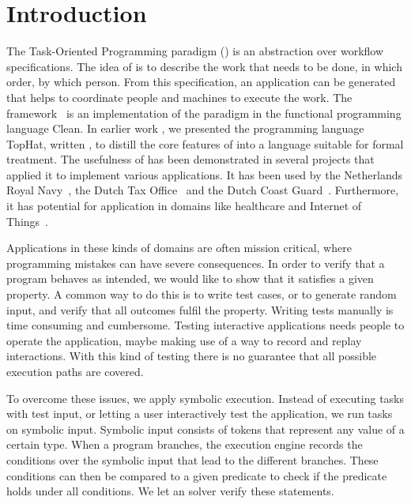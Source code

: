 
\section{Introduction}

The Task-Oriented Programming paradigm (\TOP) is an abstraction over workflow specifications.
The idea of \TOP is to describe the work that needs to be done, in which order, by which person.
From this specification, an application can be generated that helps to coordinate people and machines to execute the work.
The \ITASKS framework~\cite{DBLP:conf/ppdp/PlasmeijerLMAK12} is an implementation of the paradigm in the functional programming language Clean.
In earlier work \cite{Steenvoorden2019}, we presented the programming language TopHat, written \TOPHAT, to distill the core features of \TOP into a language suitable for formal treatment.
%
The usefulness of \TOP has been demonstrated in several projects that applied it to implement various applications.
It has been used by the Netherlands Royal Navy~\cite{jansen2018dynamic}, the Dutch Tax Office~\cite{conf/sfp/StutterheimAP17} and the Dutch Coast Guard~\cite{lijnse2012incidone}. %
Furthermore, it has potential for application in domains like healthcare and Internet of Things~\cite{DBLP:conf/cgo/KoopmanLP18}.

Applications in these kinds of domains are often mission critical, where programming mistakes can have severe consequences.
In order to verify that a \TOPHAT program behaves as intended, we would like to show that it satisfies a given property.
A common way to do this is to write test cases, or to generate random input, and verify that all outcomes fulfil the property.
Writing tests manually is time consuming and cumbersome.
Testing interactive applications needs people to operate the application, maybe making use of a way to record and replay interactions.
With this kind of testing there is no guarantee that all possible execution paths are covered.

To overcome these issues, we apply symbolic execution.
Instead of executing tasks with test input, or letting a user interactively test the application,
we run tasks on symbolic input.
Symbolic input consists of tokens that represent any value of a certain type.
When a program branches, the execution engine records the conditions over the symbolic input that lead to the different branches.
These conditions can then be compared to a given predicate to check if the predicate holds under all conditions.
We let an \SMT solver verify these statements.

